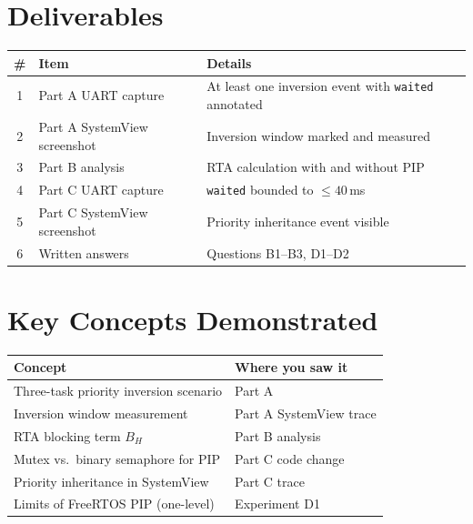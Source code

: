 \documentclass[11pt, a4paper]{article}
\begin{document}
\section{Deliverables}

\renewcommand{\arraystretch}{1.3}
\begin{tabular}{@{} c p{4.5cm} p{7cm} @{}}
  \toprule
  \textbf{\#} & \textbf{Item} & \textbf{Details} \\
  \midrule
  1 & Part A UART capture   & At least one inversion event with \texttt{waited} annotated \\
  2 & Part A SystemView screenshot & Inversion window marked and measured \\
  3 & Part B analysis       & RTA calculation with and without PIP \\
  4 & Part C UART capture   & \texttt{waited} bounded to $\leq 40$\,ms \\
  5 & Part C SystemView screenshot & Priority inheritance event visible \\
  6 & Written answers       & Questions B1--B3, D1--D2 \\
  \bottomrule
\end{tabular}
\renewcommand{\arraystretch}{1}

\section{Key Concepts Demonstrated}

\renewcommand{\arraystretch}{1.3}
\begin{tabular}{@{} p{7cm} p{6cm} @{}}
  \toprule
  \textbf{Concept} & \textbf{Where you saw it} \\
  \midrule
  Three-task priority inversion scenario      & Part A \\
  Inversion window measurement                & Part A SystemView trace \\
  RTA blocking term $B_H$                     & Part B analysis \\
  Mutex vs.\ binary semaphore for PIP         & Part C code change \\
  Priority inheritance in SystemView          & Part C trace \\
  Limits of FreeRTOS PIP (one-level)          & Experiment D1 \\
  \bottomrule
\end{tabular}
\renewcommand{\arraystretch}{1}
\end{document}

